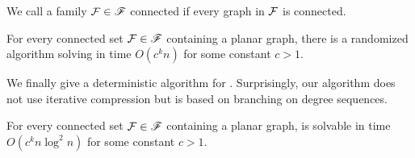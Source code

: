 We call a family ${\cal F} \in \mathscr{F}$ connected if every graph in $\cal F$ is connected. 

  \begin{theorem}\label{thm:fpt_thm1}
  For every connected  set  ${\cal F} \in \mathscr{F}$  containing a planar graph,  there is a randomized algorithm solving 
\fd{}   in time $O(c^k n)$ for some constant $c>1$. 
\end{theorem}

We finally give a deterministic algorithm for \fd{}. Surprisingly, our algorithm does not use iterative compression but  is based on branching on degree sequences. 


  \begin{theorem}\label{thm:fpt_thm2}
  For every connected set  ${\cal F} \in \mathscr{F}$   containing a planar graph,  
\fd{}  is solvable   in time $O(c^k n\log^2{n})$  for some constant $c>1$. 
\end{theorem}





 









